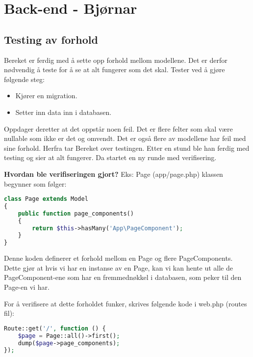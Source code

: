 
\clearpage

\section{Back-end - Bjørnar}

\subsection{Testing av forhold}

Bereket er ferdig med å sette opp forhold mellom modellene. Det er derfor nødvendig å teste for å se at alt fungerer som det skal. Tester ved å gjøre følgende steg:

\begin{itemize}
\item Kjører en migration.
\item Setter inn data inn i databasen.
\end{itemize}

Oppdager deretter at det oppstår noen feil. Det er flere felter som skal være nullable som ikke er det og omvendt.
Det er også flere av modellene har feil med sine forhold. Herfra tar Bereket over testingen. Etter en stund ble han ferdig med testing og sier at alt fungerer. Da startet en ny runde med verifisering.

\textbf{Hvordan ble verifiseringen gjort?}
Eks:
Page (app/page.php) klassen begynner som følger:

\begin{lstlisting}[language=PHP]
class Page extends Model
{
    public function page_components()
    {
        return $this->hasMany('App\PageComponent');
    }
}
\end{lstlisting}

Denne koden definerer et forhold mellom en Page og flere PageComponents. Dette gjør at hvis vi har en instanse av en Page, kan vi kan hente ut alle de PageComponent-ene som har en fremmednøkkel i databasen, som peker til den Page-en vi har.

For å verifisere at dette forholdet funker, skrives følgende kode i web.php (routes fil):

\begin{lstlisting}[language=PHP]
Route::get('/', function () {
    $page = Page::all()->first();
    dump($page->page_components);
});
\end{lstlisting}

